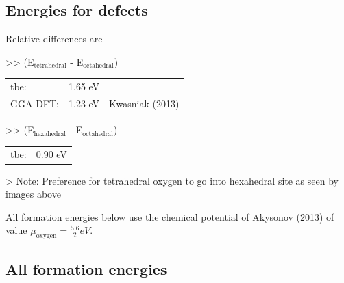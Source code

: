 \documentclass[11pt]{article}
\begin{document}
\subsection{Energies for defects}
\label{sec:org4b1afa4}

Relative differences are 

>> (E\(_{\text{tetrahedral}}\) - E\(_{\text{octahedral}}\)) 
\begin{center}
\begin{tabular}{lll}
tbe: & 1.65 eV & \\
GGA-DFT: & 1.23 eV & Kwasniak (2013)\\
\end{tabular}
\end{center}

>> (E\(_{\text{hexahedral}}\) - E\(_{\text{octahedral}}\))
\begin{center}
\begin{tabular}{ll}
tbe: & 0.90 eV\\
\end{tabular}
\end{center}

> Note: Preference for tetrahedral oxygen to go into hexahedral site as seen by images above

All formation energies below use the chemical potential of Akysonov
(2013) of value \(\mu_{\text{oxygen}} = \frac{5.6}{ 2} eV\).

\subsection{All formation energies}
\label{sec:org6f37bfd}
\end{document}

